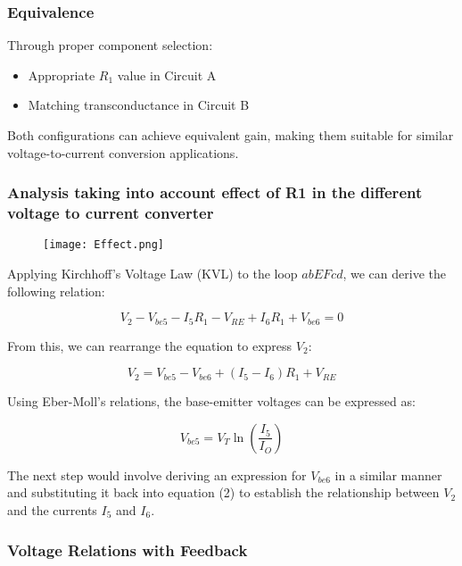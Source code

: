 \documentclass[a4paper,9pt,twoside,openany,twocolumn]{memoir}
\begin{document}
\subsubsection{Equivalence}
Through proper component selection:
\begin{itemize}
    \item Appropriate \( R_1 \) value in Circuit A
    \item Matching transconductance in Circuit B
\end{itemize}

Both configurations can achieve equivalent gain, making them suitable for similar voltage-to-current conversion applications.

\subsubsection{Analysis taking into account effect of R1 in the different voltage to current converter}
\begin{figure}[h]
    \centering
    \texttt{[image: Effect.png]} %
    \caption{}
    \label{fig:Practical}
\end{figure}
Applying Kirchhoff's Voltage Law (KVL) to the loop \( abEFcd \), we can derive the following relation:

\begin{equation}
V_2 - V_{be5} - I_5 R_1 - V_{RE} + I_6 R_1 + V_{be6} = 0 \tag{1}
\end{equation}

From this, we can rearrange the equation to express \( V_2 \):

\begin{equation}
V_2 = V_{be5} - V_{be6} + (I_5 - I_6) R_1 + V_{RE} \tag{2}
\end{equation}

Using Eber-Moll's relations, the base-emitter voltages can be expressed as:

\begin{equation}
V_{be5} = V_T \ln \left( \frac{I_5}{I_O} \right) \tag{3}
\end{equation}

The next step would involve deriving an expression for \( V_{be6} \) in a similar manner and substituting it back into equation (2) to establish the relationship between \( V_2 \) and the currents \( I_5 \) and \( I_6 \).

\subsubsection{Voltage Relations with Feedback}
\end{document}

